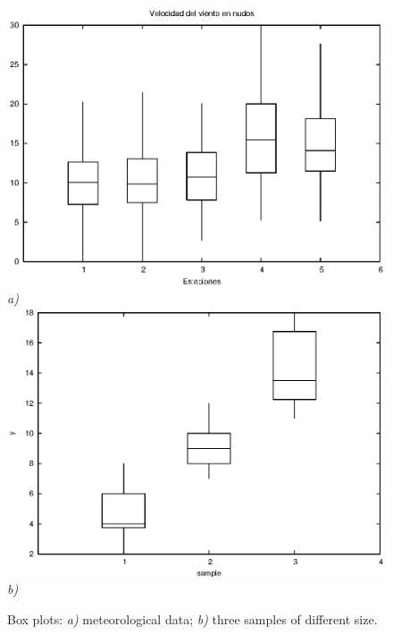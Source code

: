 \documentclass[12pt,a4paper]{article}
\begin{document}
\begin{description}
\begin{figure}
\begin{center}
\includegraphics[scale=1.0]{boxplot1.eps} \\
\emph{a)} \\ 
\includegraphics[scale=1.0]{boxplot2.eps} \\
\emph{b)} \\
\caption{Box plots: \emph{a)} meteorological data; \emph{b)} three samples of different size.}
\label{fig6}
\end{center}
\end{figure}


\end{description}



\end{document}
